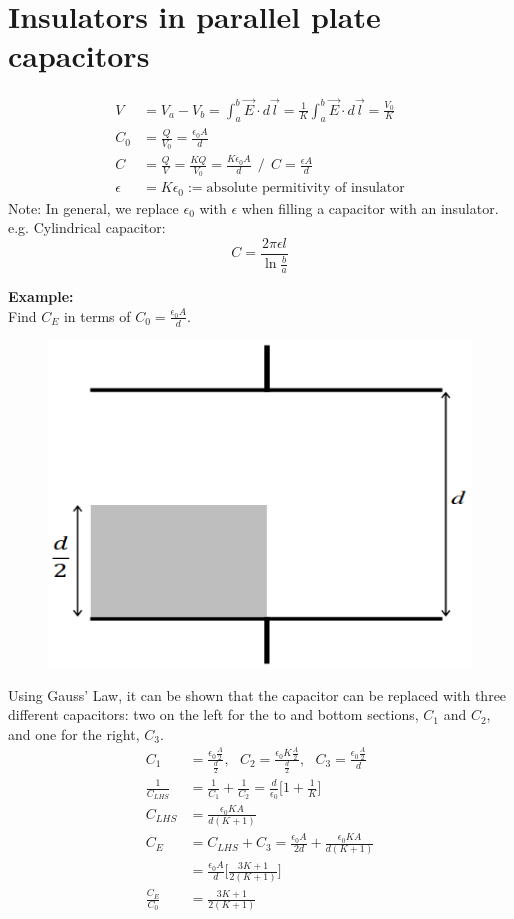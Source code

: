 \documentclass[a4paper, 11pt, normalem]{report}
\begin{document}
\section{Insulators in parallel plate capacitors}
\begin{align}
    V &= V_{a} - V_{b} = \int_{a}^{b} \vec{E} \cdot d\vec{l} = \frac{1}{K} \int_{a}^{b} \vec{E}\cdot d\vec{l} = \frac{V_{0}}{K} \\
    C_{0} &= \frac{Q}{V_{0}} = \frac{\epsilon_{0} A}{d} \\
    C &= \frac{Q}{V} = \frac{KQ}{V_{0}} = \frac{K\epsilon_{0}A}{d} ~~ \Big/ ~~ C = \frac{\epsilon A}{d} \\
    \epsilon &= K\epsilon_{0} := \text{absolute permitivity of insulator}
\end{align}
Note: In general, we replace $\epsilon_{0}$ with $\epsilon$ when filling a capacitor with an insulator.
e.g. Cylindrical capacitor:
\begin{equation}
    C = \frac{2\pi\epsilon l}{\ln\tfrac{b}{a}}
\end{equation}

\textbf{Example:}\\
Find $C_{E}$ in terms of $C_{0} = \frac{\epsilon_{0}A}{d}$.
\begin{figure}[H]
    \centering
    \includegraphics[scale=0.5]{Cap2.png}
\end{figure}
Using Gauss' Law, it can be shown that the capacitor can be replaced with three different capacitors: two on the left for the to and bottom sections, $C_{1}$ and $C_{2}$, and one for the right, $C_{3}$.
\begin{align}
    C_{1} &= \frac{\epsilon_{0}\tfrac{A}{2}}{\tfrac{d}{2}}, ~~~ C_{2} = \frac{\epsilon_{0}K\tfrac{A}{2}}{\tfrac{d}{2}}, ~~~ C_{3} = \frac{\epsilon_{0}\tfrac{A}{2}}{d} \\
    \frac{1}{C_{LHS}} &= \frac{1}{C_{1}} + \frac{1}{C_{2}} = \frac{d}{\epsilon_{0}} \Big[1 + \frac{1}{K}\Big] \\
    C_{LHS} &= \frac{\epsilon_{0}KA}{d(K + 1)} \\
    C_{E} &= C_{LHS} + C_{3} = \frac{\epsilon_{0}A}{2d} + \frac{\epsilon_{0}KA}{d(K + 1)} \\ 
          &= \frac{\epsilon_{0}A}{d}\Big[\frac{3K + 1}{2(K + 1)}\Big] \\
    \frac{C_{E}}{C_{0}} &= \frac{3K + 1}{2(K + 1)}
\end{align}
\end{document}
